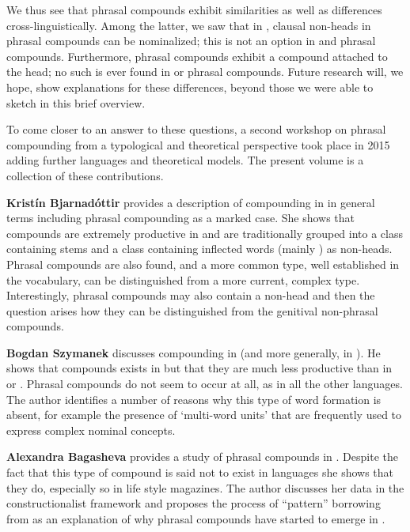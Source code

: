 \documentclass[output=paper]{LSP/langsci}
\begin{document}
We thus see that phrasal compounds exhibit similarities as well as
differences cross-linguistically. Among the latter, we saw that in
, clausal non-heads in phrasal compounds can be nominalized;
this is not an option in  and  phrasal
compounds. Furthermore,  phrasal compounds exhibit a compound
 attached to the head; no such  is ever found in  or
 phrasal compounds. Future research will, we hope, show
explanations for these differences, beyond those we were able to
sketch in this brief overview.

To come closer to an answer to these questions, a second workshop on
phrasal compounding from a typological and theoretical perspective
took place in 2015 adding further languages and theoretical
models. The present volume is a collection of these contributions. 

\textbf{Kristín Bjarnadóttir} provides a description of compounding in
 in general terms including phrasal compounding as a marked
case. She shows that compounds are extremely productive in
   and are traditionally grouped into a class containing
  stems and a class containing inflected words (mainly ) as
  non-heads. Phrasal compounds are also found, and a more common type,
  well established in the vocabulary, can be distinguished from a more
  current, complex type. Interestingly, phrasal compounds may also
  contain a  non-head and then the question arises how they
  can be distinguished from the genitival non-phrasal compounds. 

  \textbf{Bogdan Szymanek} discusses compounding in  (and more
  generally, in ). He shows that compounds exists in  but
  that they are much less productive than in  or
  . Phrasal compounds do not seem to occur at all, as in all
  the other  languages. The author identifies a number of
  reasons why this type of word formation is absent, for example the
  presence of `multi-word units' that are frequently used to express
  complex nominal concepts. 

  \textbf{Alexandra Bagasheva} provides a study of phrasal compounds
  in . Despite the fact that this type of compound is said
  not to exist in  languages she shows that they do, especially
  so in life style magazines. The author discusses her data in the
  constructionalist framework and proposes the process of ``pattern''
  borrowing from  as an explanation of why phrasal compounds
  have started to emerge in .
\end{document}
